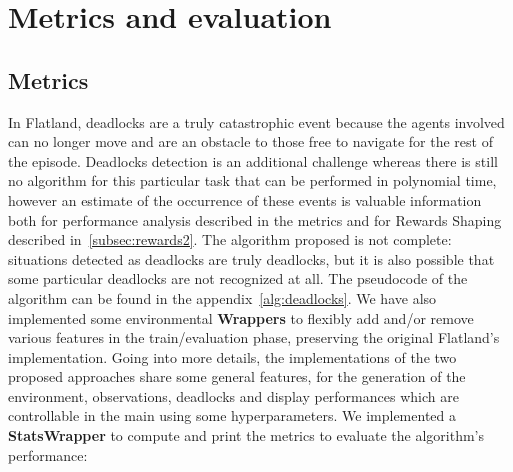\documentclass[11pt, a4paper, hidelinks]{report}
\begin{document}
\section{Metrics and evaluation}\label{sec:metrics-and-evaluation}

\subsection{Metrics}\label{subsec:metrics}

In Flatland, deadlocks are a truly catastrophic event because the agents involved can no longer move and are an obstacle to those free to navigate for the rest of the episode.
Deadlocks detection is an additional challenge whereas there is still no algorithm for this particular task that can be performed in polynomial time, however an estimate of the occurrence of these events is valuable information both for performance analysis described in the metrics and for Rewards Shaping described in~\ref{subsec:rewards2}.
The algorithm proposed is not complete: situations detected as deadlocks are truly deadlocks, but it is also possible that some particular deadlocks are not recognized at all.
The pseudocode of the algorithm can be found in the appendix~\ref{alg:deadlocks}.
We have also implemented some environmental \textbf{Wrappers} to flexibly add and/or remove various features in the train/evaluation phase, preserving the original Flatland's implementation.
Going into more details, the implementations of the two proposed approaches share some general features, for the generation of the environment, observations, deadlocks and display performances which are controllable in the main using some hyperparameters.
We implemented a \textbf{StatsWrapper} to compute and print the metrics to evaluate the algorithm's performance:
\end{document}
